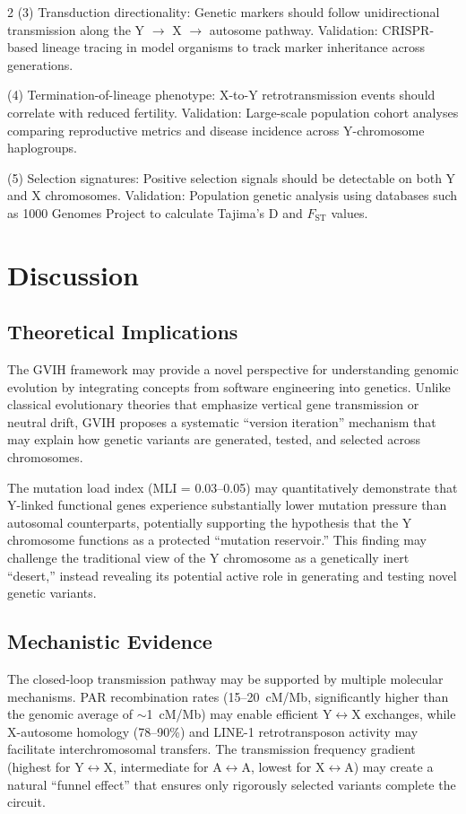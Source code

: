 \documentclass{base}
\begin{document}
\begin{multicols}{2}
(3) Transduction directionality: Genetic markers should follow unidirectional transmission along the Y $\rightarrow$ X $\rightarrow$ autosome pathway. Validation: CRISPR-based lineage tracing in model organisms to track marker inheritance across generations. 

(4) Termination-of-lineage phenotype: X-to-Y retrotransmission events should correlate with reduced fertility. Validation: Large-scale population cohort analyses comparing reproductive metrics and disease incidence across Y-chromosome haplogroups. 

(5) Selection signatures: Positive selection signals should be detectable on both Y and X chromosomes. Validation: Population genetic analysis using databases such as 1000 Genomes Project to calculate Tajima's D and $F_{\text{ST}}$ values. 


\section{Discussion}
\subsection{Theoretical Implications}
The GVIH framework may provide a novel perspective for understanding genomic evolution by integrating concepts from software engineering into genetics. Unlike classical evolutionary theories that emphasize vertical gene transmission or neutral drift, GVIH proposes a systematic ``version iteration'' mechanism that may explain how genetic variants are generated, tested, and selected across chromosomes.

The mutation load index (MLI = 0.03--0.05) may quantitatively demonstrate that Y-linked functional genes experience substantially lower mutation pressure than autosomal counterparts, potentially supporting the hypothesis that the Y chromosome functions as a protected ``mutation reservoir.'' This finding may challenge the traditional view of the Y chromosome as a genetically inert ``desert,'' instead revealing its potential active role in generating and testing novel genetic variants.

\subsection{Mechanistic Evidence}
The closed-loop transmission pathway may be supported by multiple molecular mechanisms. PAR recombination rates (15--20~cM/Mb, significantly higher than the genomic average of $\sim$1~cM/Mb) may enable efficient Y$\leftrightarrow$X exchanges, while X-autosome homology (78--90\%) and LINE-1 retrotransposon activity may facilitate interchromosomal transfers. The transmission frequency gradient (highest for Y$\leftrightarrow$X, intermediate for A$\leftrightarrow$A, lowest for X$\leftrightarrow$A) may create a natural ``funnel effect'' that ensures only rigorously selected variants complete the circuit.


\end{multicols}
\end{document}
